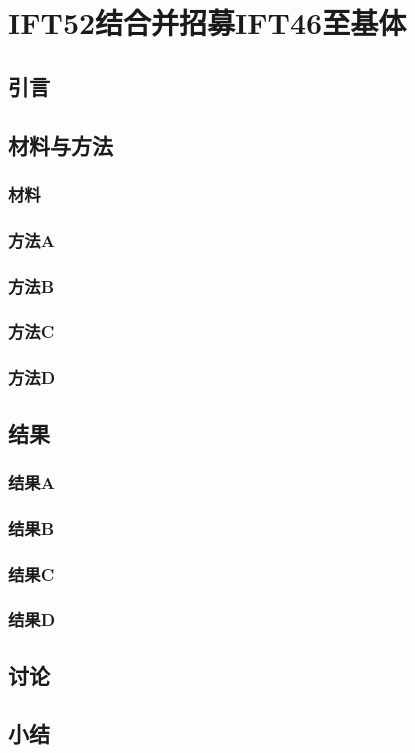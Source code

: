 \chapter{IFT52结合并招募IFT46至基体}
\renewcommand{\leftmark}{第五章\quad IFT52结合并招募IFT46至基体}

\section{引言}
\blindtext

\section{材料与方法}
\subsection{材料}
\Blindtext

\subsection{方法A}
\Blindtext

\subsection{方法B}
\Blindtext

\subsection{方法C}
\Blindtext

\subsection{方法D}
\Blindtext

\section{结果}
\subsection{结果A}
\Blindtext

\subsection{结果B}
\Blindtext

\subsection{结果C}
\Blindtext

\subsection{结果D}
\Blindtext

\section{讨论}
\Blindtext

\section{小结}
\Blindtext